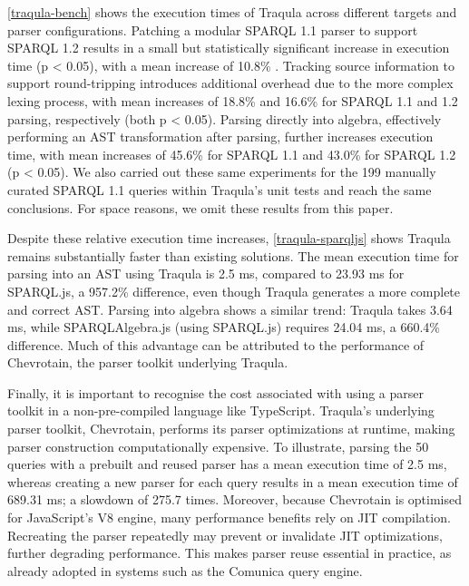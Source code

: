 \documentclass[runningheads]{llncs}
\begin{document}
    \autoref{traqula-bench} shows the execution times of Traqula across different targets and parser configurations.
    Patching a modular SPARQL 1.1 parser to support SPARQL 1.2 results in a small but statistically significant increase in execution time (p < 0.05),
    with a mean increase of 10.8\% .
    Tracking source information to support round-tripping introduces additional overhead due to the more complex lexing process,
    with mean increases of 18.8\%
    and 16.6\%  for SPARQL 1.1 and 1.2 parsing, respectively (both p < 0.05).
    Parsing directly into algebra, effectively performing an AST transformation after parsing, further increases execution time,
    with mean increases of 45.6\%  for SPARQL 1.1 and 43.0\%  for SPARQL 1.2 (p < 0.05).
    We also carried out these same experiments for the 199 manually curated SPARQL 1.1 queries within Traqula's unit tests and reach the same conclusions.
    For space reasons, we omit these results from this paper.

    Despite these relative execution time increases, \autoref{traqula-sparqljs} shows Traqula remains substantially faster than existing solutions.
    The mean execution time for parsing into an AST using Traqula is 2.5 ms, compared to 23.93 ms for SPARQL.js, a 957.2\% difference,
    even though Traqula generates a more complete and correct AST.
    Parsing into algebra shows a similar trend: Traqula takes 3.64 ms, while SPARQLAlgebra.js (using SPARQL.js) requires 24.04 ms, a 660.4\% difference.
    Much of this advantage can be attributed to the performance of Chevrotain, the parser toolkit underlying Traqula.

    Finally, it is important to recognise the cost associated with using a parser toolkit in a non-pre-compiled language like TypeScript.
    Traqula's underlying parser toolkit, Chevrotain, performs its parser optimizations at runtime, making parser construction computationally expensive.
    To illustrate, parsing the 50 queries with a prebuilt and reused parser has a mean execution time of 2.5 ms,
    whereas creating a new parser for each query results in a mean execution time of 689.31 ms; a slowdown of 275.7 times.
    Moreover, because Chevrotain is optimised for JavaScript's V8 engine, many performance benefits rely on JIT compilation.
    Recreating the parser repeatedly may prevent or invalidate JIT optimizations, further degrading performance.
    This makes parser reuse essential in practice, as already adopted in systems such as the Comunica query engine.
\end{document}
